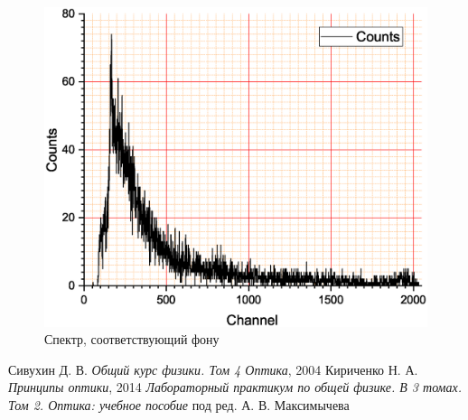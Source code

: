 \documentclass[a4paper]{article}
\begin{document}
\begin{figure}
	\centering
	\includegraphics[width=0.49\linewidth]{фон}
	\caption{Спектр, соответствующий фону}
	\label{fig:фон}
\end{figure}

\newpage
\begin{thebibliography}{9}
	 Сивухин Д. В. \emph{Общий курс физики. Том 4 Оптика}, 2004
	 Кириченко Н. А. \emph{Принципы оптики}, 2014
	 \emph{Лабораторный практикум по общей физике. В 3 томах. Том 2. Оптика: учебное пособие} под ред. А. В. Максимычева
\end{thebibliography}
\end{document}
